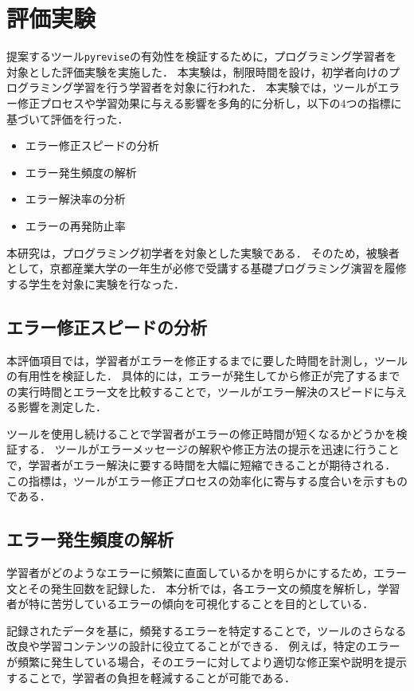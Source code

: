 \documentclass[12pt,twoside]{jbook}
\newcommand{\pyrevise}{\texttt{pyrevise}}
\begin{document}
\chapter{評価実験}\label{sect:evaluation}
提案するツール\pyrevise の有効性を検証するために，プログラミング学習者を対象とした評価実験を実施した．
本実験は，制限時間を設け，初学者向けのプログラミング学習を行う学習者を対象に行われた．
本実験では，ツールがエラー修正プロセスや学習効果に与える影響を多角的に分析し，以下の4つの指標に基づいて評価を行った．
\begin{itemize}
  \item エラー修正スピードの分析
  \item エラー発生頻度の解析
  \item エラー解決率の分析
  \item エラーの再発防止率
\end{itemize}

本研究は，プログラミング初学者を対象とした実験である．
そのため，被験者として，京都産業大学の一年生が必修で受講する基礎プログラミング演習を履修する学生を対象に実験を行なった．

\section{エラー修正スピードの分析}
本評価項目では，学習者がエラーを修正するまでに要した時間を計測し，ツールの有用性を検証した．
具体的には，エラーが発生してから修正が完了するまでの実行時間とエラー文を比較することで，ツールがエラー解決のスピードに与える影響を測定した．

ツールを使用し続けることで学習者がエラーの修正時間が短くなるかどうかを検証する．
ツールがエラーメッセージの解釈や修正方法の提示を迅速に行うことで，学習者がエラー解決に要する時間を大幅に短縮できることが期待される．
この指標は，ツールがエラー修正プロセスの効率化に寄与する度合いを示すものである．

\section{エラー発生頻度の解析}
学習者がどのようなエラーに頻繁に直面しているかを明らかにするため，エラー文とその発生回数を記録した．
本分析では，各エラー文の頻度を解析し，学習者が特に苦労しているエラーの傾向を可視化することを目的としている．

記録されたデータを基に，頻発するエラーを特定することで，ツールのさらなる改良や学習コンテンツの設計に役立てることができる．
例えば，特定のエラーが頻繁に発生している場合，そのエラーに対してより適切な修正案や説明を提示することで，学習者の負担を軽減することが可能である．
\end{document}
